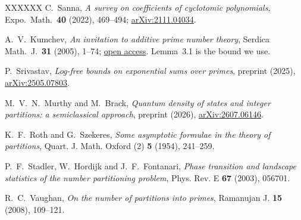 \documentclass[11pt,a4paper]{article}
\theoremstyle{plain}
\theoremstyle{definition}
\theoremstyle{remark}
\begin{document}
\begin{thebibliography}{XXXXXX}
C.~Sanna,
\emph{A survey on coefficients of cyclotomic polynomials},
Expo.\ Math.\ \textbf{40} (2022), 469--494;
\href{https://arxiv.org/abs/2111.04034}{arXiv:2111.04034}.

A.~V.~Kumchev,
\emph{An invitation to additive prime number theory},
Serdica Math.\ J.\ \textbf{31} (2005), 1--74;
\href{https://tigerweb.towson.edu/akumchev/a17.pdf}{open access}.
Lemma~3.1 is the bound we use.

P.~Srivastav,
\emph{Log-free bounds on exponential sums over primes}, preprint (2025),
\href{https://arxiv.org/abs/2505.07803}{arXiv:2505.07803}.

M.~V.~N.~Murthy and M.~Brack,
\emph{Quantum density of states and integer partitions: a semiclassical
approach}, preprint (2026),
\href{https://arxiv.org/abs/2607.06146}{arXiv:2607.06146}.

K.~F.~Roth and G.~Szekeres,
\emph{Some asymptotic formulae in the theory of partitions},
Quart. J. Math. Oxford (2) \textbf{5} (1954), 241--259.

P.~F.~Stadler, W.~Hordijk and J.~F.~Fontanari,
\emph{Phase transition and landscape statistics of the number partitioning
problem}, Phys. Rev. E \textbf{67} (2003), 056701.

R.~C.~Vaughan,
\emph{On the number of partitions into primes},
Ramanujan J. \textbf{15} (2008), 109--121.

\end{thebibliography}
\end{document}
